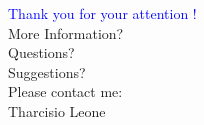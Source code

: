 \documentclass{beamer}
\begin{document}
\begin{frame}
\vspace{1cm}
\begin{center}
\Huge\textcolor{blue}{Thank you for your attention !} \\

\large {More Information? \\ Questions? \\ Suggestions? \\}
\vspace{0.5cm}
Please contact me: \\
Tharcisio Leone \\
\vspace{0.2cm}
 \\
 \\
\end{center}
\end{frame}
\end{document}
